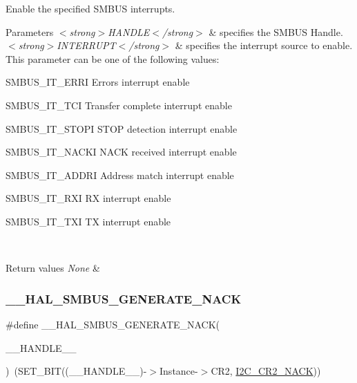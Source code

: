 Enable the specified S\+M\+B\+US interrupts. 


\begin{DoxyParams}{Parameters}
{\em $<$strong$>$\+H\+A\+N\+D\+L\+E$<$/strong$>$} & specifies the S\+M\+B\+US Handle. \\
\hline
{\em $<$strong$>$\+I\+N\+T\+E\+R\+R\+U\+P\+T$<$/strong$>$} & specifies the interrupt source to enable. This parameter can be one of the following values\+: \begin{DoxyItemize}
\item S\+M\+B\+U\+S\+\_\+\+I\+T\+\_\+\+E\+R\+RI Errors interrupt enable \item S\+M\+B\+U\+S\+\_\+\+I\+T\+\_\+\+T\+CI Transfer complete interrupt enable \item S\+M\+B\+U\+S\+\_\+\+I\+T\+\_\+\+S\+T\+O\+PI S\+T\+OP detection interrupt enable \item S\+M\+B\+U\+S\+\_\+\+I\+T\+\_\+\+N\+A\+C\+KI N\+A\+CK received interrupt enable \item S\+M\+B\+U\+S\+\_\+\+I\+T\+\_\+\+A\+D\+D\+RI Address match interrupt enable \item S\+M\+B\+U\+S\+\_\+\+I\+T\+\_\+\+R\+XI RX interrupt enable \item S\+M\+B\+U\+S\+\_\+\+I\+T\+\_\+\+T\+XI TX interrupt enable\end{DoxyItemize}
\\
\hline
\end{DoxyParams}

\begin{DoxyRetVals}{Return values}
{\em None} & \\
\hline
\end{DoxyRetVals}
\mbox{\label{group___s_m_b_u_s___exported___macros_ga0897cee11905248ab6ad938fe376101f}} 
\subsubsection{\texorpdfstring{\+\_\+\+\_\+\+H\+A\+L\+\_\+\+S\+M\+B\+U\+S\+\_\+\+G\+E\+N\+E\+R\+A\+T\+E\+\_\+\+N\+A\+CK}{\_\_HAL\_SMBUS\_GENERATE\_NACK}}
{\footnotesize\ttfamily \#define \+\_\+\+\_\+\+H\+A\+L\+\_\+\+S\+M\+B\+U\+S\+\_\+\+G\+E\+N\+E\+R\+A\+T\+E\+\_\+\+N\+A\+CK(\begin{DoxyParamCaption}\item[{}]{\+\_\+\+\_\+\+H\+A\+N\+D\+L\+E\+\_\+\+\_\+ }\end{DoxyParamCaption})~(S\+E\+T\+\_\+\+B\+IT((\+\_\+\+\_\+\+H\+A\+N\+D\+L\+E\+\_\+\+\_\+)-\/$>$Instance-\/$>$C\+R2, \hyperlink{group___peripheral___registers___bits___definition_ga8bcbbaf564cb68e3afed79c3cd34aa1f}{I2\+C\+\_\+\+C\+R2\+\_\+\+N\+A\+CK}))}



